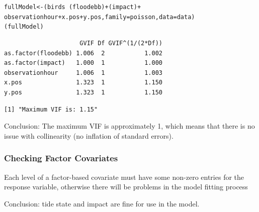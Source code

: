 \begin{frame}[fragile]
\begin{knitrout}\footnotesize
{}\color{fgcolor}\begin{kframe}
\begin{alltt}
fullModel <- (birds ~ (floodebb) + (impact) + 
    observationhour + x.pos + y.pos, family = poisson, data = data)
(fullModel)
\end{alltt}
\begin{verbatim}
                     GVIF Df GVIF^(1/(2*Df))
as.factor(floodebb) 1.006  2           1.002
as.factor(impact)   1.000  1           1.000
observationhour     1.006  1           1.003
x.pos               1.323  1           1.150
y.pos               1.323  1           1.150
\end{verbatim}
\end{kframe}
\end{knitrout}


\begin{knitrout}\footnotesize
{}\color{fgcolor}\begin{kframe}
\begin{verbatim}
[1] "Maximum VIF is: 1.15"
\end{verbatim}
\end{kframe}
\end{knitrout}


\begin{block}{Conclusion:}
The maximum VIF is approximately 1, which means that there is no issue with collinearity (no inflation of standard errors).
\end{block}
\end{frame}


\begin{frame}[fragile]
\frametitle{Checking Factor Covariates}
Each level of a factor-based covariate must have some non-zero entries for the response variable, otherwise there will be problems in the model fitting process 
\begin{knitrout}\footnotesize
{}\color{fgcolor}
\end{knitrout}


\noindent Conclusion: tide state and impact are fine for use in the model.

\end{frame}
